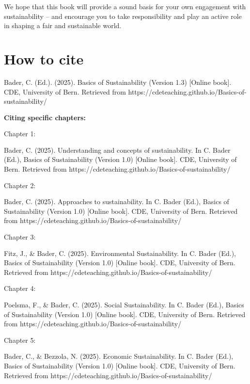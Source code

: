 \documentclass[
  a4paper,
  DIV=11,
  numbers=noendperiod,
  oneside,
  openany]{scrreprt}
\begin{document}
We hope that this book will provide a sound basis for your own
engagement with sustainability -- and encourage you to take
responsibility and play an active role in shaping a fair and sustainable
world.

\section*{How to cite}\label{how-to-cite}


Bader, C. (Ed.). (2025). Basics of Sustainability (Version 1.3)
{[}Online book{]}. CDE, University of Bern. Retrieved from
https://cdeteaching.github.io/Basics-of-sustainability/

\textbf{Citing specific chapters:}

Chapter 1:

Bader, C. (2025). Understanding and concepts of sustainability. In C.
Bader (Ed.), Basics of Sustainability (Version 1.0) {[}Online book{]}.
CDE, University of Bern. Retrieved from
https://cdeteaching.github.io/Basics-of-sustainability/

Chapter 2:

Bader, C. (2025). Approaches to sustainability. In C. Bader (Ed.),
Basics of Sustainability (Version 1.0) {[}Online book{]}. CDE,
University of Bern. Retrieved from
https://cdeteaching.github.io/Basics-of-sustainability/

Chapter 3:

Fitz, J., \& Bader, C. (2025). Environmental Sustainability. In C. Bader
(Ed.), Basics of Sustainability (Version 1.0) {[}Online book{]}. CDE,
University of Bern. Retrieved from
https://cdeteaching.github.io/Basics-of-sustainability/

Chapter 4:

Poelsma, F., \& Bader, C. (2025). Social Sustainability. In C. Bader
(Ed.), Basics of Sustainability (Version 1.0) {[}Online book{]}. CDE,
University of Bern. Retrieved from
https://cdeteaching.github.io/Basics-of-sustainability/

Chapter 5:

Bader, C., \& Bezzola, N. (2025). Economic Sustainability. In C. Bader
(Ed.), Basics of Sustainability (Version 1.0) {[}Online book{]}. CDE,
University of Bern. Retrieved from
https://cdeteaching.github.io/Basics-of-sustainability/
\end{document}
